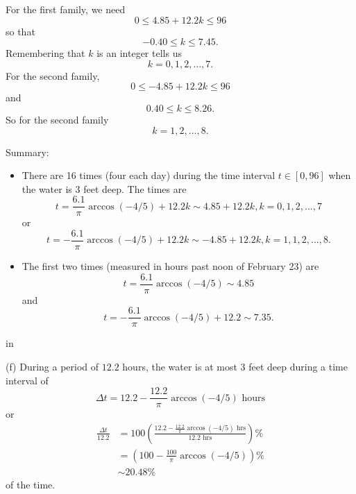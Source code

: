 \documentclass{ximera}
\newcommand{\pskip}{\vskip 0.1 in}
\begin{document}
\begin{example}
\begin{explanation}
For the first family, we need
\[
         0 \leq 4.85 + 12.2 k \leq 96
\]
so that
\[
      -0.40 \leq k \leq 7.45.
\]
Remembering that $k$ is an integer tells us
\[
   k = 0, 1, 2, \ldots ,7.
\]
For the second family,
\[
   0 \leq  - 4.85 + 12.2 k \leq 96
\]
and
\[
       0.40\leq k \leq 8.26 .
\]
So for the second family
\[
     k = 1, 2, \ldots , 8 .
\]

Summary:
\begin{itemize}
\item{There are 16 times (four each day) during the time interval $t\in [0,96]$ when the water is $3$ feet deep. The times are
\[
   t = \frac{6.1}{\pi}\arccos(-4/5) + 12.2k  \sim 4.85 + 12.2k ,  k=0, 1, 2, \ldots , 7
\]
or
\[
      t = -  \frac{6.1}{\pi}\arccos(-4/5) + 12.2k  \sim -4.85 + 12.2k ,  k=1, 1, 2, \ldots , 8.
\]}

\item{
The first two times (measured in hours past noon of February 23) are
\[
    t =  \frac{6.1}{\pi} \arccos(-4/5) \sim 4.85
\]
and 
\[
    t = - \frac{6.1}{\pi}\arccos(-4/5) + 12.2 \sim 7.35 .
\]
}
\end{itemize}

\pskip

(f) During a period of $12.2$ hours, the water is at most $3$ feet deep during a time interval of 
\[
   \Delta t = 12.2 - \frac{12.2}{\pi} \arccos(-4/5) \text{ hours}
\]
or
\begin{align*}
   \frac{\Delta t}{12.2}  &= 100\left( \frac{12.2 - \frac{12.2}{\pi} \arccos(-4/5) \text{ hrs}}{12.2 \text{ hrs}} \right)\%  \\
                                   &= \left( 100-\frac{100}{\pi} \arccos(-4/5) \right) \% \\
                                   &\sim  20.48\%
\end{align*}
of the time.
\end{explanation}

\end{example}
\end{document}
